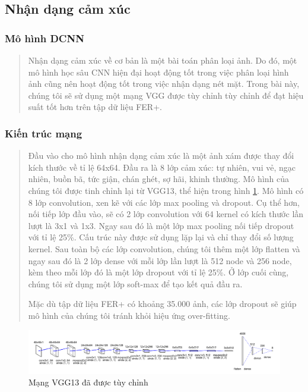 \documentclass{article}
\begin{document}
\subsection{Nhận dạng cảm xúc}
\subsubsection{Mô hình DCNN}
\begin{quote}
   Nhận dạng cảm xúc về cơ bản là một bài toán phân loại ảnh. Do đó, một mô hình học sâu CNN hiện đại hoạt động tốt trong việc phân loại hình ảnh cũng nên hoạt động tốt trong việc nhận dạng nét mặt. Trong bài này, chúng tôi sẽ sử dụng một mạng VGG được tùy chỉnh tùy chỉnh để đạt hiệu suất tốt hơn trên tập dữ liệu FER+.
\end{quote}

\subsubsection{Kiến trúc mạng}
\begin{quote}
   Đầu vào cho mô hình nhận dạng cảm xúc là một ảnh xám được thay đổi kích thước về tỉ lệ 64x64. Đầu ra là 8 lớp cảm xúc: tự nhiên, vui vẻ, ngạc nhiên, buồn bã, tức giận, chán ghét, sợ hãi, khinh thường. Mô hình của chúng tôi được tinh chỉnh lại từ VGG13, thể hiện trong hình \ref{fig:model}. Mô hình có 8 lớp convolution, xen kẽ với các lớp max pooling và dropout. Cụ thể hơn, nối tiếp lớp đầu vào, sẽ có 2 lớp convolution với 64 kernel có kích thước lần lượt là 3x1 và 1x3. Ngay sau đó là một lớp max pooling nối tiếp dropout với tỉ lệ 25\%. Cấu trúc này được sử dụng lặp lại và chỉ thay đổi số lượng kernel. Sau toàn bộ các lớp convolution, chúng tôi thêm một lớp flatten và ngay sau đó là 2 lớp dense với mỗi lớp lần lượt là 512 node và 256 node, kèm theo mỗi lớp đó là một lớp dropout với tỉ lệ 25\%. Ở lớp cuối cùng, chúng tôi sử dụng một lớp soft-max để tạo kết quả đầu ra. 

   Mặc dù tập dữ liệu FER+ có khoảng 35.000 ảnh, các lớp dropout sẽ giúp mô hình của chúng tôi tránh khỏi hiệu ứng over-fitting.
\end{quote}
\begin{figure}[H]
   \centering
   \includegraphics[width=\textwidth]{network.png}
   \caption{Mạng VGG13 đã được tùy chỉnh}
   \label{fig:model}
\end{figure}
\end{document}

